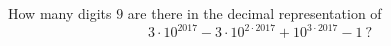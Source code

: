How many digits $9$ are there in the decimal representation of
\[
3\cdot10^{2017}-3\cdot10^{2\cdot2017}+10^{3\cdot2017}-1\ ?
\]
